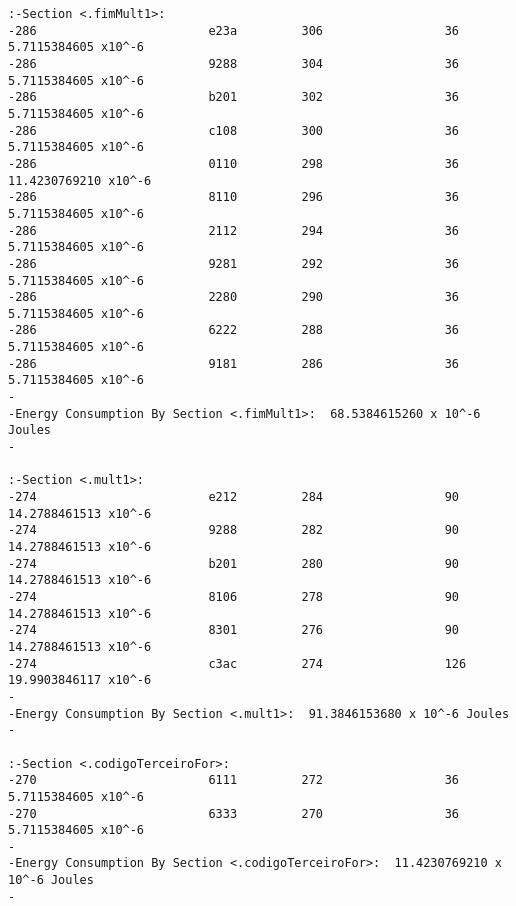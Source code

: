 \begin{verbatim}
:-Section <.fimMult1>:  
-286                        e23a         306                 36              5.7115384605 x10^-6 
-286                        9288         304                 36              5.7115384605 x10^-6 
-286                        b201         302                 36              5.7115384605 x10^-6 
-286                        c108         300                 36              5.7115384605 x10^-6 
-286                        0110         298                 36              11.4230769210 x10^-6 
-286                        8110         296                 36              5.7115384605 x10^-6 
-286                        2112         294                 36              5.7115384605 x10^-6 
-286                        9281         292                 36              5.7115384605 x10^-6 
-286                        2280         290                 36              5.7115384605 x10^-6 
-286                        6222         288                 36              5.7115384605 x10^-6 
-286                        9181         286                 36              5.7115384605 x10^-6 
-                                                                                          
-Energy Consumption By Section <.fimMult1>:  68.5384615260 x 10^-6 Joules
-                                                                                          

:-Section <.mult1>:  
-274                        e212         284                 90              14.2788461513 x10^-6 
-274                        9288         282                 90              14.2788461513 x10^-6 
-274                        b201         280                 90              14.2788461513 x10^-6 
-274                        8106         278                 90              14.2788461513 x10^-6 
-274                        8301         276                 90              14.2788461513 x10^-6 
-274                        c3ac         274                 126              19.9903846117 x10^-6 
-                                                                                          
-Energy Consumption By Section <.mult1>:  91.3846153680 x 10^-6 Joules
-                                                                                          

:-Section <.codigoTerceiroFor>:  
-270                        6111         272                 36              5.7115384605 x10^-6 
-270                        6333         270                 36              5.7115384605 x10^-6 
-                                                                                          
-Energy Consumption By Section <.codigoTerceiroFor>:  11.4230769210 x 10^-6 Joules
-                                                                                          


\end{verbatim}
